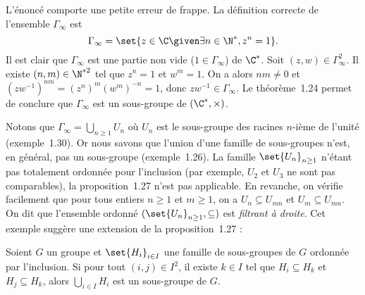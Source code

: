 L'énoncé comporte une petite erreur de frappe.
La définition correcte de l'ensemble $\Gamma_\infty$ est
\[
  \Gamma_\infty = \set{z\in\C\given\exists n\in\N^*, z^n = 1}.
\]
Il est clair que $\Gamma_\infty$ est une partie non vide ($1\in\Gamma_\infty$) de $\C^*$.
Soit $(z,w)\in\Gamma^2_\infty$.
Il existe $(n,m)\in\N^{*2}$ tel que $z^n = 1$ et $w^m = 1$.
On a alors $nm\neq 0$ et $(zw^{-1})^{nm} = (z^n)^m (w^m)^{-n} = 1$, donc $zw^{-1}\in\Gamma_\infty$.
Le théorème~1.24 permet de conclure que $\Gamma_\infty$ est un sous-groupe de $(\C^*,\times)$.

\begin{remarque}
  Notons que $\Gamma_\infty = \bigcup_{n \geq 1} U_n$ où $U_n$ est le sous-groupe des racines $n$-ième de l'unité (exemple~1.30).
  Or nous savons que l'union d'une famille de sous-groupes n'est, en général, pas un sous-groupe (exemple~1.26).
  La famille $\set{U_n}_{n\geq 1}$ n'étant pas totalement ordonnée pour l'inclusion (par exemple, $U_2$ et $U_3$ ne sont pas comparables), la proposition~1.27 n'est pas applicable.
  En revanche, on vérifie facilement que pour tous entiers $n\geq 1$ et $m\geq 1$, on a $U_n\subseteq U_{mn}$ et $U_m\subseteq U_{mn}$.
  On dit que l'ensemble ordonné $(\set{U_n}_{n\geq 1},\subseteq)$ est \emph{filtrant à droite}.
  Cet exemple suggère une extension de la proposition~1.27 :

  \begin{proposition}
    Soient $G$ un groupe et $\set{H_i}_{i\in I}$ une famille de sous-groupes de $G$ ordonnée par l'inclusion.
    Si pour tout $(i, j)\in I^2$, il existe $k\in I$ tel que $H_i\subseteq H_k$ et $H_j\subseteq H_k$, alors $\bigcup_{i\in I} H_i$ est un sous-groupe de $G$.
  \end{proposition}
\end{remarque}

